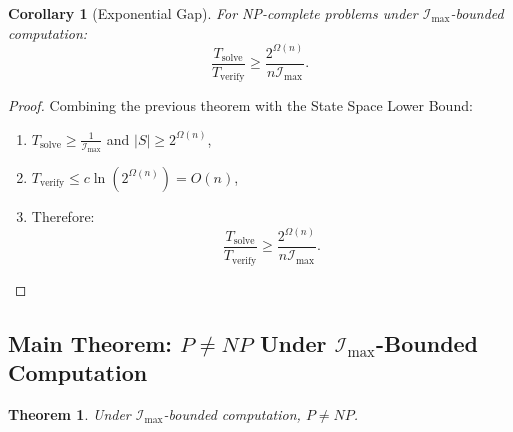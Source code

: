\documentclass[12pt]{article}
\newtheorem{theorem}{Theorem}
\newtheorem{corollary}{Corollary}
\begin{document}
\begin{corollary}[Exponential Gap]
For NP-complete problems under \(\mathcal{I}_{\text{max}}\)-bounded computation:
\[
\frac{T_{\text{solve}}}{T_{\text{verify}}} \geq \frac{2^{\Omega(n)}}{n\mathcal{I}_{\text{max}}}.
\]
\end{corollary}

\begin{proof}
Combining the previous theorem with the State Space Lower Bound:
\begin{enumerate}
    \item \(T_{\text{solve}} \geq \frac{1}{\mathcal{I}_{\text{max}}}\) and \(|S| \geq 2^{\Omega(n)}\),
    \item \(T_{\text{verify}} \leq c\ln(2^{\Omega(n)}) = O(n)\),
    \item Therefore:
    \[
    \frac{T_{\text{solve}}}{T_{\text{verify}}} \geq \frac{2^{\Omega(n)}}{n\mathcal{I}_{\text{max}}}.
    \]
\end{enumerate}
\end{proof}

\subsection{Main Theorem: \(P \neq NP\) Under \(\mathcal{I}_{\text{max}}\)-Bounded Computation}

\begin{theorem}
Under \(\mathcal{I}_{\text{max}}\)-bounded computation, \(P \neq NP\).
\end{theorem}
\end{document}
